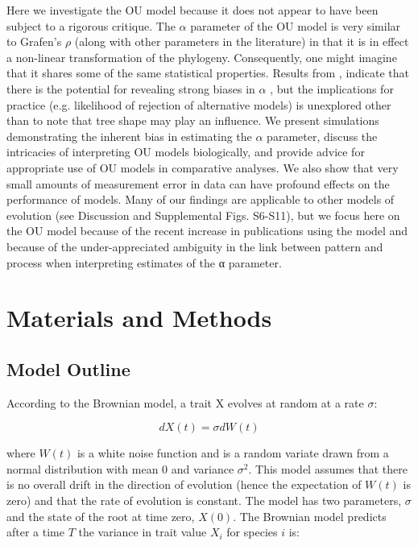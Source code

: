 \documentclass[a4paper,12pt]{article}
\begin{document}
Here we investigate the OU model because it does not appear to have been subject to a rigorous critique. The $\alpha$ parameter of the OU model is very similar to Grafen’s $\rho$ (along with other parameters in the literature) in that it is in effect a non-linear transformation of the phylogeny. Consequently, one might imagine that it shares some of the same statistical properties. Results from \citet{ho2013asymptotic}, indicate that there is the potential for revealing strong biases in $\alpha$ , but the implications for practice (e.g. likelihood of rejection of alternative models) is unexplored other than to note that tree shape may play an influence. We present simulations demonstrating the inherent bias in estimating the $\alpha$ parameter, discuss the intricacies of interpreting OU models biologically, and provide advice for appropriate use of OU models in comparative analyses. We also show that very small amounts of measurement error in data can have profound effects on the performance of models. Many of our findings are applicable to other models of evolution (see Discussion and Supplemental Figs. S6-S11), but we focus here on the OU model because of the recent increase in publications using the model and because of the under-appreciated ambiguity in the link between pattern and process when interpreting estimates of the α parameter. 

\section{Materials and Methods}
\subsection{Model Outline} 
\label{section:models} 
According to the Brownian model, a trait X evolves at random at a rate $\sigma$:

  \begin{equation}
    dX(t) = \sigma dW(t)
    \label{equation:BMrate} 
  \end{equation}

where $W(t)$ is a white noise function and is a random variate drawn from a normal distribution with mean $0$ and variance $\sigma^2$. This model assumes that there is no overall drift in the direction of evolution (hence the expectation of $W(t)$ is zero) and that the rate of evolution is constant. The model has two parameters, $\sigma$ and the state of the root at time zero, $X(0)$. The Brownian model predicts after a time $T$ the variance in trait value $X_i$ for species $i$ is:
\end{document}
